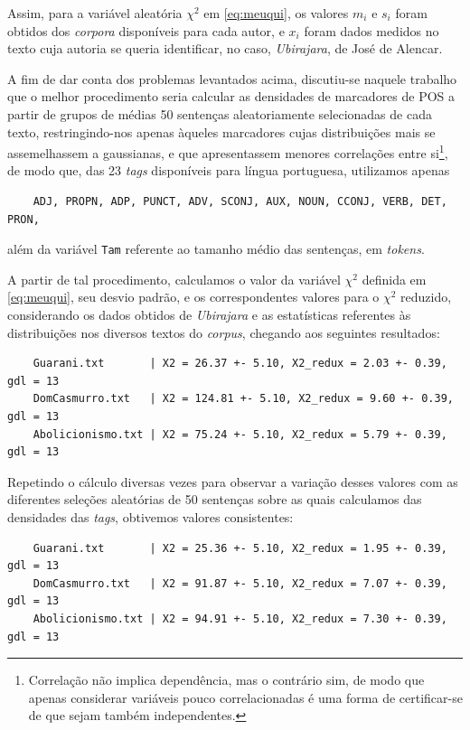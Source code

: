 \documentclass[10pt,a4paper,onecolumn]{article}
\theoremstyle{definition}
\theoremstyle{remark}
\begin{document}
Assim, para a variável aleatória $\chi^2$ em \eqref{eq:meuqui}, os valores $m_i$ e $s_i$ foram obtidos dos \emph{corpora} disponíveis para cada autor, e $x_i$ foram dados medidos no texto cuja autoria se queria identificar, no caso, \emph{Ubirajara}, de José de Alencar.   

A fim de dar conta dos problemas levantados acima, discutiu-se naquele trabalho que o melhor procedimento seria calcular as densidades de marcadores de POS a partir de grupos de médias 50 sentenças aleatoriamente selecionadas de cada texto, restringindo-nos apenas àqueles marcadores cujas distribuições mais se assemelhassem a gaussianas, e que apresentassem menores correlações entre si\footnote{Correlação não implica dependência, mas o contrário sim, de modo que apenas considerar variáveis pouco correlacionadas é uma forma de certificar-se de que sejam também independentes.}, de modo que, das 23 \emph{tags} disponíveis para língua portuguesa, utilizamos apenas  
\begin{verbatim}
	ADJ, PROPN, ADP, PUNCT, ADV, SCONJ, AUX, NOUN, CCONJ, VERB, DET, PRON,
\end{verbatim} 
além da variável \texttt{Tam} referente ao tamanho médio das sentenças, em \emph{tokens}.

A partir de tal procedimento, calculamos o valor da variável $\chi^2$ definida em \eqref{eq:meuqui}, seu desvio padrão, e os correspondentes valores para o $\chi^2$ reduzido, considerando os dados obtidos de \emph{Ubirajara} e as estatísticas referentes às distribuições nos diversos textos do \emph{corpus}, chegando aos seguintes resultados:

\begin{verbatim}
	Guarani.txt       | X2 = 26.37 +- 5.10, X2_redux = 2.03 +- 0.39, gdl = 13
	DomCasmurro.txt   | X2 = 124.81 +- 5.10, X2_redux = 9.60 +- 0.39, gdl = 13
	Abolicionismo.txt | X2 = 75.24 +- 5.10, X2_redux = 5.79 +- 0.39, gdl = 13
\end{verbatim}
Repetindo o cálculo diversas vezes para observar a variação desses valores com as diferentes seleções aleatórias de 50 sentenças sobre as quais calculamos das densidades das \emph{tags}, obtivemos valores consistentes:

\begin{verbatim}
	Guarani.txt       | X2 = 25.36 +- 5.10, X2_redux = 1.95 +- 0.39, gdl = 13
	DomCasmurro.txt   | X2 = 91.87 +- 5.10, X2_redux = 7.07 +- 0.39, gdl = 13
	Abolicionismo.txt | X2 = 94.91 +- 5.10, X2_redux = 7.30 +- 0.39, gdl = 13
\end{verbatim}
\end{document}
